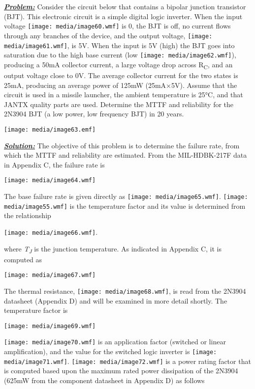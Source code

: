 \emph{\textbf{\ul{Problem:}}} Consider the circuit below that contains a
bipolar junction transistor (BJT). This electronic circuit is a simple
digital logic inverter. When the input voltage
\texttt{[image: media/image60.wmf]} is 0, the BJT is off, no current
flows through any branches of the device, and the output voltage,
\texttt{[image: media/image61.wmf]}, is 5V. When the input is 5V (high)
the BJT goes into saturation due to the high base current (low
\texttt{[image: media/image62.wmf]}), producing a 50mA collector
current, a large voltage drop across R\textsubscript{C}, and an output
voltage close to 0V. The average collector current for the two states is
25mA, producing an average power of 125mW (25mA×5V). Assume that the
circuit is used in a missile launcher, the ambient temperature is 25°C,
and that JANTX quality parts are used. Determine the MTTF and
reliability for the 2N3904 BJT (a low power, low frequency BJT) in 20
years.

\texttt{[image: media/image63.emf]}

\emph{\textbf{\ul{Solution:}}} The objective of this problem is to
determine the failure rate, from which the MTTF and reliability are
estimated. From the MIL-HDBK-217F data in Appendix C, the failure rate
is

\texttt{[image: media/image64.wmf]}

The base failure rate is given directly as
\texttt{[image: media/image65.wmf]}. \texttt{[image: media/image55.wmf]}
is the temperature factor and its value is determined from the
relationship

\texttt{[image: media/image66.wmf]}.

where \emph{T\textsubscript{J}} is the junction temperature. As
indicated in Appendix C, it is computed as

\texttt{[image: media/image67.wmf]}

The thermal resistance, \texttt{[image: media/image68.wmf]}, is read
from the 2N3904 datasheet (Appendix D) and will be examined in more
detail shortly. The temperature factor is

\texttt{[image: media/image69.wmf]}

\texttt{[image: media/image70.wmf]} is an application factor (switched
or linear amplification), and the value for the switched logic inverter
is \texttt{[image: media/image71.wmf]}.
\texttt{[image: media/image72.wmf]} is a power rating factor that is
computed based upon the maximum rated power dissipation of the 2N3904
(625mW from the component datasheet in Appendix D) as follows

